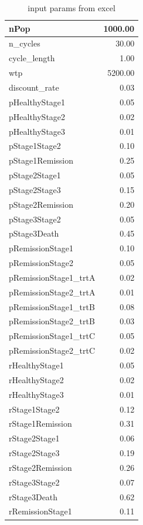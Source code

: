 \documentclass[
  letterpaper,
  DIV=11,
  numbers=noendperiod,
  oneside]{scrartcl}
\begin{document}
\begin{table}

\caption{input params from excel}
\centering
\begin{tabular}[t]{l|r}
\hline
nPop & 1000.00\\
\hline
n\_cycles & 30.00\\
\hline
cycle\_length & 1.00\\
\hline
wtp & 5200.00\\
\hline
discount\_rate & 0.03\\
\hline
pHealthyStage1 & 0.05\\
\hline
pHealthyStage2 & 0.02\\
\hline
pHealthyStage3 & 0.01\\
\hline
pStage1Stage2 & 0.10\\
\hline
pStage1Remission & 0.25\\
\hline
pStage2Stage1 & 0.05\\
\hline
pStage2Stage3 & 0.15\\
\hline
pStage2Remission & 0.20\\
\hline
pStage3Stage2 & 0.05\\
\hline
pStage3Death & 0.45\\
\hline
pRemissionStage1 & 0.10\\
\hline
pRemissionStage2 & 0.05\\
\hline
pRemissionStage1\_trtA & 0.02\\
\hline
pRemissionStage2\_trtA & 0.01\\
\hline
pRemissionStage1\_trtB & 0.08\\
\hline
pRemissionStage2\_trtB & 0.03\\
\hline
pRemissionStage1\_trtC & 0.05\\
\hline
pRemissionStage2\_trtC & 0.02\\
\hline
rHealthyStage1 & 0.05\\
\hline
rHealthyStage2 & 0.02\\
\hline
rHealthyStage3 & 0.01\\
\hline
rStage1Stage2 & 0.12\\
\hline
rStage1Remission & 0.31\\
\hline
rStage2Stage1 & 0.06\\
\hline
rStage2Stage3 & 0.19\\
\hline
rStage2Remission & 0.26\\
\hline
rStage3Stage2 & 0.07\\
\hline
rStage3Death & 0.62\\
\hline
rRemissionStage1 & 0.11\\

\end{tabular}
\end{table}
\end{document}

